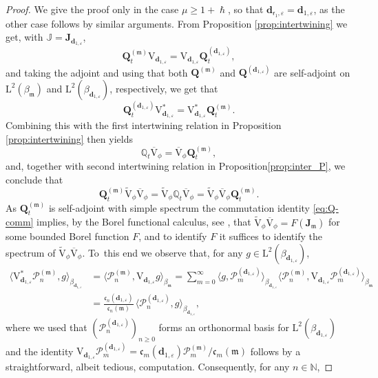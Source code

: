 \documentclass[JEP,XML,SOM,Unicode]{cedram}
\let\epsilon\varepsilon
\theoremstyle{plain}
\theoremstyle{definition}
\newcommand{\N}{\mathbb{N}}
\renewcommand{\P}{\mathcal{P}}
\newcommand{\J}{\mathds{Q}}
\newcommand{\calJ}{\mathds{J}}
\newcommand{\Leb}{\mathrm{L}}
\newcommand{\calJd}{\mathbf{J}}
\newcommand{\m}{\mathfrak{m}}
\newcommand{\dpt}{\bm{d}_{\vat,\epsilon}}
\newcommand{\dz}{{\bm{d}}_{1,\epsilon}}
\newcommand{\lam}{{\bm{\lambda}_1}}
\newcommand{\vat}{{\mathsf{r}_1}}
\newcommand{\Q}[1][\mo]{\mathbf{Q}^{({#1})}}
\newcommand{\gab}[1][\lam,\mo]{{\beta_{#1}}}
\let\h\hslash
\let\mo\mu
\begin{document}
\begin{proof}
We give the proof only in the case $\mo \geq 1+\h$, so that $\dpt = \dz$, as the other case follows by similar arguments. From Proposition \ref{prop:intertwining} we get, with $\calJ = \calJd_{\dz}$,
\begin{equation*}
\Q[\m]_t \mathrm{V}_{\dz} = \mathrm{V}_{\dz} \Q[\dz]_t,
\end{equation*}
and taking the adjoint and using that both $\Q[\m]$ and $\Q[\dz]$ are self-adjoint on $\Leb^2(\gab[\m])$ and $\Leb^2(\gab[\dz])$, respectively, we get that
\begin{equation*}
\Q[\dz]_t \mathrm{V}_{\dz}^* = \mathrm{V}_{\dz}^* \Q[\m]_t.
\end{equation*}
Combining this with the first intertwining relation in Proposition \ref{prop:intertwining} then yields
\begin{equation*}
\J_t \overline{\mathrm{V}}_{\phi} = \overline{\mathrm{V}}_{\phi} \Q[\m]_t,
\end{equation*}
and, together with second intertwining relation in Proposition\ref{prop:inter_P}, we conclude that
\begin{equation}
\label{eq:Q-comm}
\Q[\m]_t \widetilde{\mathrm{V}}_{\phi}\overline{\mathrm{V}}_{\phi} = \widetilde{\mathrm{V}}_{\phi} \J_t \overline{\mathrm{V}}_{\phi} = \widetilde{\mathrm{V}}_{\phi}\overline{\mathrm{V}}_{\phi} \Q[\m]_t.
\end{equation}
As $\Q[\m]_t$ is self-adjoint with simple spectrum the commutation identity \eqref{eq:Q-comm} implies, by the Borel functional calculus, see \eg \cite{Rudin1973}, that $\widetilde{\mathrm{V}}_{\phi}\overline{\mathrm{V}}_{\phi} = F(\calJd_{\m})$ for some bounded Borel function $F$, and to identify $F$ it suffices to identify the spectrum of $\widetilde{\mathrm{V}}_{\phi}\overline{\mathrm{V}}_{\phi}$. To~this end we observe that, for any $g \in \Leb^2(\gab[\dz])$,
\begin{align*}
\langle \mathrm{V}_{\dz}^* \P_n^{(\m)}, g \rangle_{\gab[\dz]} &= \langle \P_n^{(\m)}, \mathrm{V}_{\dz} g \rangle_{\gab[\m]} = \sum_{m=0}^\infty \langle g, \P_m^{(\dz)} \rangle_{\gab[\dz]} \langle \P_n^{(\m)}, \mathrm{V}_{\dz} \P_m^{(\dz)} \rangle_{\gab[\m]} \\ & = \frac{\mathfrak{c}_n(\dz)}{\mathfrak{c}_n(\m)}\, \langle \P_n^{(\dz)},g \rangle_{\gab[\dz]},
\end{align*}
where we used that $(\P_n^{(\dz)})_{n \geq 0}$ forms an orthonormal basis for $\Leb^2(\gab[\dz])$ and the identity $\mathrm{V}_{\dz} \P_m^{(\dz)} = {\mathfrak{c}_m(\dz)} \P_m^{(\m)} / {\mathfrak{c}_m(\m)}$ follows by a straightforward, albeit tedious, computation. Consequently, for any $n \in \N$,

\end{proof}
\end{document}
